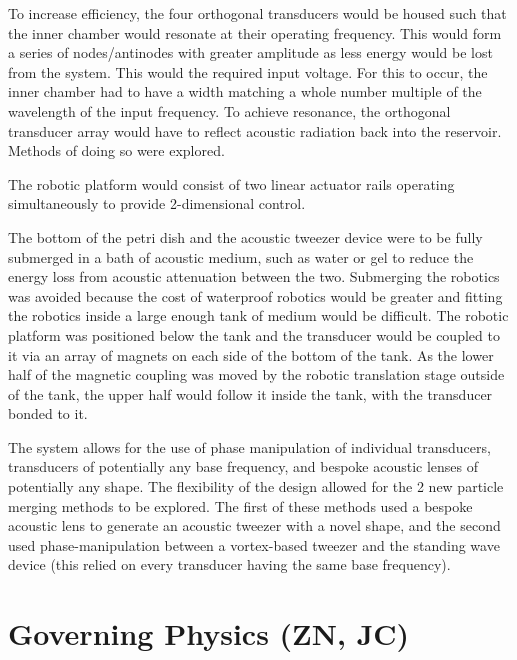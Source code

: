 \documentclass[11pt,a4paper]{article}
\begin{document}
To increase efficiency, the four orthogonal transducers would be housed such that the inner chamber would resonate at their operating frequency. This would form a series of nodes/antinodes with greater amplitude as less energy would be lost from the system. This would the required input voltage. For this to occur, the inner chamber had to have a width matching a whole number multiple of the wavelength of the input frequency. To achieve resonance, the orthogonal transducer array would have to reflect acoustic radiation back into the reservoir. Methods of doing so were explored.

The robotic platform would consist of two linear actuator rails operating simultaneously to provide 2-dimensional control.

The bottom of the petri dish and the acoustic tweezer device were to be fully submerged in a bath of acoustic medium, such as water or gel to reduce the energy loss from acoustic attenuation between the two. Submerging the robotics was avoided because the cost of waterproof robotics would be greater and fitting the robotics inside a large enough tank of medium would be difficult. The robotic platform was positioned below the tank and the transducer would be coupled to it via an array of magnets on each side of the bottom of the tank. As the lower half of the magnetic coupling was moved by the robotic translation stage outside of the tank, the upper half would follow it inside the tank, with the transducer bonded to it.

The system allows for the use of phase manipulation of individual transducers, transducers of potentially any base frequency, and bespoke acoustic lenses of potentially any shape. The flexibility of the design allowed for the 2 new particle merging methods to be explored. The first of these methods used a bespoke acoustic lens to generate an acoustic tweezer with a novel shape, and the second used phase-manipulation between a vortex-based tweezer and the standing wave device (this relied on every transducer having the same base frequency).


\section{Governing Physics (ZN, JC)}
\end{document}
